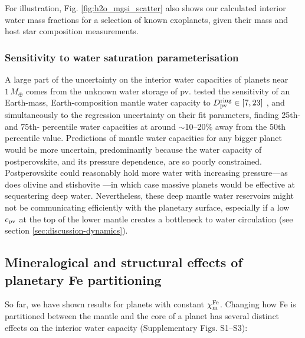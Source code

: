 \documentclass[fleqn,usenatbib]{mnras}
\newcommand{\coreeff}{$\chi^{\rm Fe}_{\rm m}$}
\begin{document}
For illustration, Fig. \ref{fig:h2o_mgsi_scatter} also shows our calculated interior water mass fractions for a selection of known exoplanets, given their mass and host star composition measurements. %


\subsubsection{Sensitivity to water saturation parameterisation}\label{sec:results_sensitivity}
A large part of the uncertainty on the interior water capacities of planets near $1\,M_\oplus$ comes from the unknown water storage of pv. \citet{dong_constraining_2021} tested the sensitivity of an Earth-mass, Earth-composition mantle water capacity to  $D^{\rm ring}_{\rm pv} \in [7, 23]$ \citep{inoue_water_2010}, and simultaneously to the regression uncertainty on their fit parameters, finding 25th- and 75th- percentile water capacities at around $\sim$10--20\% away from the 50th percentile value. Predictions of mantle water capacities for any bigger planet would be more uncertain, predominantly because the water capacity of postperovskite, and its pressure dependence, are so poorly constrained. Postperovskite could reasonably hold more water with increasing pressure---as does olivine and stishovite \citep{panero_hydrogen_2004, dong_constraining_2021}---in which case massive planets would be effective at sequestering deep water. Nevertheless, these deep mantle water reservoirs might not be communicating efficiently with the planetary surface, especially if a low $c_{\rm pv}$ at the top of the lower mantle creates a bottleneck to water circulation (see section \ref{sec:discussion-dynamics}).



\subsection{Mineralogical and structural effects of planetary Fe partitioning}\label{sec:results_fe}

So far, we have shown results for planets with constant \coreeff. Changing how Fe is partitioned between the mantle and the core of a planet has several distinct effects on the interior water capacity (Supplementary Figs. S1--S3):
\end{document}
